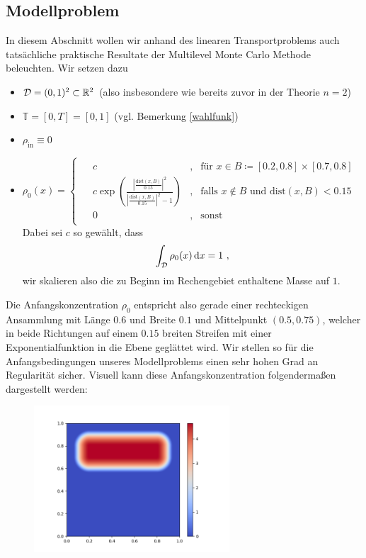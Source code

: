 
\subsection{Modellproblem}

In diesem Abschnitt wollen wir anhand des linearen Transportproblems auch tatsächliche praktische Resultate der Multilevel Monte Carlo Methode beleuchten.
Wir setzen dazu
\begin{itemize}
	\item $ \mathcal{D} = (0,1)^2 \subset \mathbb{R}^2 $ (also insbesondere wie bereits zuvor in der Theorie $ n=2 $)
	\item $ \mathbb{T} = [0,T] = [0,1] $ (vgl. Bemerkung \ref{wahlfunk})
	\item $ \rho_{\text{in}} \equiv 0 $
	\item $ \rho_0(x) = 
	\begin{cases*}
		\begin{array}{llll}
			&c & , &\text{für }x \in B \coloneqq [0.2,0.8] \times [0.7 ,0.8]  \\
			&c\exp \left(\frac{ \left| \frac{\text{dist}(x,B)}{0.15} \right| ^2}{\left|\frac{\text{dist}(x,B)}{0.15}\right|^2-1}\right) &, &\text{falls } x \not \in B \text{ und dist}(x,B) < 0.15 \\
			&0 &, & \text{sonst}
		\end{array}
	\end{cases*}$ \\
	Dabei sei $ c $ so gewählt, dass 
	\[
		\int_{\mathcal{D}} \rho_0(x) \, \mathrm{d} x = 1 \ ,
	\]
	wir skalieren also die zu Beginn im Rechengebiet enthaltene Masse auf $ 1 $.
\end{itemize} 
Die Anfangskonzentration $ \rho_0 $ entspricht also gerade einer rechteckigen Ansammlung mit Länge $ 0.6$ und Breite $ 0.1$ und Mittelpunkt $ (0.5,0.75) $, welcher in beide Richtungen auf einem $ 0.15$ breiten Streifen mit einer Exponentialfunktion in die Ebene geglättet wird. 
Wir stellen so für die Anfangsbedingungen unseres Modellproblems einen sehr hohen Grad an Regularität sicher. 
Visuell kann diese Anfangskonzentration folgendermaßen dargestellt werden:
\begin{figure}[H]
	\centering
	\includegraphics[width=0.65\textwidth]{plots/anfangsbedingung.png} 
\end{figure}
